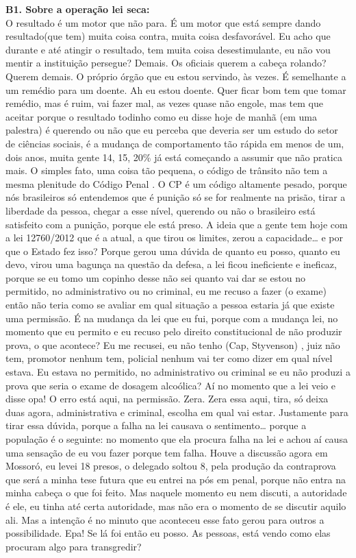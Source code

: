 \documentclass[
	12pt,				%
	openright,			%
	twoside,			%
	a4paper,			%
	chapter=TITLE,		%
	section=TITLE,		%
	subsection=TITLE,	%
	subsubsection=TITLE,%
	spanish,            %
	english,			%
	brazil				%
	]{abntex2}
\begin{document}
\begin{anexosenv}
\hypertarget{B1}{}
\par
\textbf{B1. Sobre a operação lei seca:}\\
	O resultado é um motor que não para. É um motor que está sempre dando resultado(que tem) muita coisa contra, muita coisa desfavorável. Eu acho que durante e até atingir o resultado, tem muita coisa desestimulante, eu não vou mentir a instituição persegue? Demais. Os oficiais querem a cabeça rolando? Querem demais. O próprio órgão que eu estou servindo, às vezes.
	É semelhante a um remédio para um doente. Ah eu estou doente. Quer ficar bom tem que tomar remédio, mas é ruim, vai fazer mal, as vezes quase não engole, mas tem que aceitar porque o resultado todinho como eu disse hoje de manhã (em uma palestra) é querendo ou não que eu perceba que deveria ser um estudo do setor de ciências sociais, é a mudança de comportamento tão rápida em menos de um, dois anos, muita gente 14, 15, 20\% já está começando a assumir que não pratica mais. O simples fato, uma coisa tão pequena, o código de trânsito não tem a mesma plenitude do Código Penal . O CP é um código altamente pesado, porque nós brasileiros só entendemos que é punição só se for realmente na prisão, tirar a liberdade da pessoa, chegar a esse nível, querendo ou não o brasileiro está satisfeito com a punição, porque ele está preso. A ideia que a gente tem hoje com a lei 12760/2012 que é a atual, a que tirou os limites, zerou a capacidade… e por que o Estado fez isso? Porque gerou uma dúvida de quanto eu posso, quanto eu  devo,  virou uma bagunça na questão da defesa, a lei ficou ineficiente e ineficaz, porque se eu tomo um copinho desse não sei quanto vai dar se estou no permitido, no administrativo ou no criminal, eu me recuso a fazer (o exame) então não teria como se avaliar em qual situação a pessoa estaria já que existe uma permissão. É na mudança da lei que eu fui, porque com a mudança lei, no momento que eu permito e eu recuso pelo direito constitucional de não produzir prova, o que acontece? Eu me recusei, eu não tenho (Cap, Styvenson) , juiz não tem, promotor  nenhum tem, policial nenhum vai ter como dizer em qual nível estava. Eu estava no permitido, no administrativo ou criminal se eu não produzi a prova que seria o exame de dosagem alcoólica? Aí no momento que a lei veio e disse opa! O erro está aqui, na permissão. Zera. Zera essa aqui, tira, só deixa duas agora, administrativa e criminal, escolha em qual vai estar. Justamente para tirar essa dúvida, porque a falha na lei causava o sentimento… porque a população é o seguinte: no momento que ela procura falha na lei e achou aí causa uma sensação de eu vou fazer porque tem falha. Houve a discussão agora em Mossoró, eu levei 18 presos,  o delegado soltou 8, pela produção da contraprova que será a minha tese futura que eu entrei na pós em penal, porque não entra na minha cabeça o que foi feito. Mas naquele momento eu nem discuti, a autoridade é ele, eu tinha até certa autoridade, mas não era o momento de se discutir aquilo ali.  Mas a intenção é no minuto que aconteceu esse fato gerou para outros  a possibilidade. Epa! Se lá foi então eu posso. As pessoas, está vendo como elas procuram algo para transgredir? 

\end{anexosenv}
\end{document}
